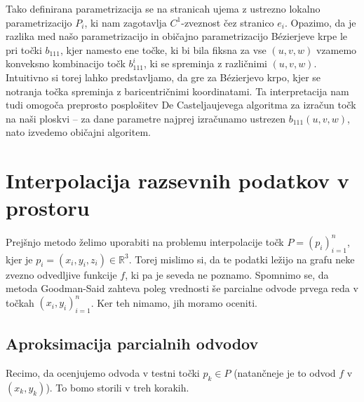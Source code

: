 \documentclass[ letterpaper, titlepage, fleqn]{article}
\newcommand{\R}{\mathbb R}
\begin{document}
{Tako definirana parametrizacija se na stranicah ujema z ustrezno lokalno parametrizacijo $P_i$, ki nam zagotavlja $C^1$-zveznost čez stranico $e_i$. Opazimo, da je razlika med našo parametrizacijo in običajno parametrizacijo Bézierjeve krpe le pri točki $b_{111}$, kjer namesto ene točke, ki bi bila fiksna za vse $(u,v,w)$ vzamemo konveksno kombinacijo točk $b_{111}^i$, ki se spreminja z različnimi $(u,v,w)$. Intuitivno si torej lahko predstavljamo, da gre za  Bézierjevo krpo, kjer se notranja točka spreminja z baricentričnimi koordinatami. Ta interpretacija nam tudi omogoča preprosto posplošitev De Casteljaujevega algoritma za izračun točk na naši ploskvi -- za dane parametre najprej izračunamo ustrezen $b_{111}(u,v,w)$, nato izvedemo običajni algoritem.



\section{Interpolacija razsevnih podatkov v prostoru}
Prejšnjo metodo želimo uporabiti na problemu interpolacije točk $P = (p_i)_{i=1}^n$, kjer je $p_i = (x_i,y_i,z_i) \in \R^3$. 
Torej mislimo si, da te podatki ležijo na grafu neke zvezno odvedljive funkcije $f$, ki pa je seveda ne poznamo.
Spomnimo se, da metoda Goodman-Said zahteva poleg vrednosti še parcialne odvode prvega reda v točkah $(x_i,y_i)_{i=1}^n$.
Ker teh nimamo, jih moramo oceniti.

\subsection{Aproksimacija parcialnih odvodov}
Recimo, da ocenjujemo odvoda v testni točki $p_k \in P$ (natančneje je to odvod $f$ v $(x_k,y_k)$). 
To bomo storili v treh korakih.

}
\end{document}
